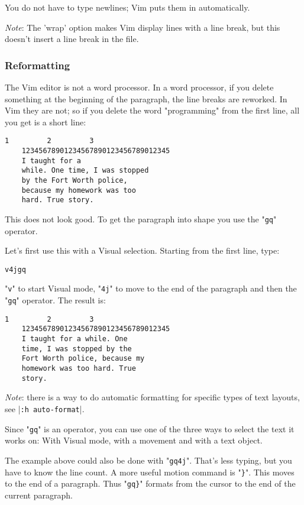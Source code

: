 You do not have to type newlines; Vim puts them in automatically.

\emph{Note}: The 'wrap' option makes Vim display lines with a line break, but this doesn't insert a line break in the file.
\subsubsection{Reformatting}
The Vim editor is not a word processor.
In a word processor, if you delete something at the beginning of the paragraph, the line breaks are reworked.
In Vim they are not; so if you delete the word "programming" from the first line, all you get is a short line:

\begin{Verbatim}[samepage=true]
             1         2         3
    12345678901234567890123456789012345
    I taught for a 
    while. One time, I was stopped 
    by the Fort Worth police, 
    because my homework was too 
    hard. True story. 
\end{Verbatim}

This does not look good.
To get the paragraph into shape you use the "\verb!gq!" operator.

Let's first use this with a Visual selection.
Starting from the first line, type:

\begin{Verbatim}[samepage=true]
 v4jgq
\end{Verbatim}

"\verb!v!" to start Visual mode, "\verb!4j!" to move to the end of the paragraph and then the "\verb!gq!" operator.
The result is:

\begin{Verbatim}[samepage=true]
             1         2         3
    12345678901234567890123456789012345
    I taught for a while. One 
    time, I was stopped by the 
    Fort Worth police, because my 
    homework was too hard. True 
    story. 
\end{Verbatim}

\emph{Note}: there is a way to do automatic formatting for specific types of text layouts, see |\verb!:h auto-format!|.

Since "\verb!gq!" is an operator, you can use one of the three ways to select the text it works on: With Visual mode, with a movement and with a text object.

The example above could also be done with "\verb!gq4j!".
That's less typing, but you have to know the line count.
A more useful motion command is "\verb!}!".
This moves to the end of a paragraph.
Thus "\verb!gq}!" formats from the cursor to the end of the current paragraph.

